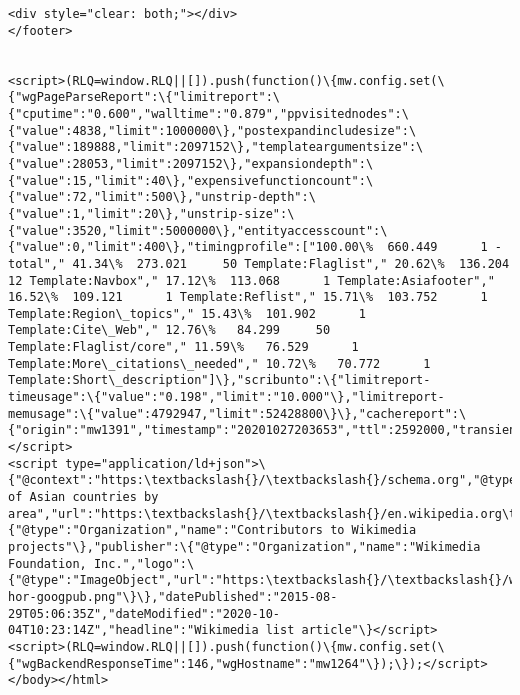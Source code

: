 \documentclass[11pt]{article}
\begin{document}
\begin{Verbatim}[commandchars=\\\{\}]
	<div style="clear: both;"></div>
</footer>


<script>(RLQ=window.RLQ||[]).push(function()\{mw.config.set(\{"wgPageParseReport":\{"limitreport":\{"cputime":"0.600","walltime":"0.879","ppvisitednodes":\{"value":4838,"limit":1000000\},"postexpandincludesize":\{"value":189888,"limit":2097152\},"templateargumentsize":\{"value":28053,"limit":2097152\},"expansiondepth":\{"value":15,"limit":40\},"expensivefunctioncount":\{"value":72,"limit":500\},"unstrip-depth":\{"value":1,"limit":20\},"unstrip-size":\{"value":3520,"limit":5000000\},"entityaccesscount":\{"value":0,"limit":400\},"timingprofile":["100.00\%  660.449      1 -total"," 41.34\%  273.021     50 Template:Flaglist"," 20.62\%  136.204     12 Template:Navbox"," 17.12\%  113.068      1 Template:Asiafooter"," 16.52\%  109.121      1 Template:Reflist"," 15.71\%  103.752      1 Template:Region\_topics"," 15.43\%  101.902      1 Template:Cite\_Web"," 12.76\%   84.299     50 Template:Flaglist/core"," 11.59\%   76.529      1 Template:More\_citations\_needed"," 10.72\%   70.772      1 Template:Short\_description"]\},"scribunto":\{"limitreport-timeusage":\{"value":"0.198","limit":"10.000"\},"limitreport-memusage":\{"value":4792947,"limit":52428800\}\},"cachereport":\{"origin":"mw1391","timestamp":"20201027203653","ttl":2592000,"transientcontent":false\}\}\});\});</script>
<script type="application/ld+json">\{"@context":"https:\textbackslash{}/\textbackslash{}/schema.org","@type":"Article","name":"List of Asian countries by area","url":"https:\textbackslash{}/\textbackslash{}/en.wikipedia.org\textbackslash{}/wiki\textbackslash{}/List\_of\_Asian\_countries\_by\_area","sameAs":"http:\textbackslash{}/\textbackslash{}/www.wikidata.org\textbackslash{}/entity\textbackslash{}/Q20983969","mainEntity":"http:\textbackslash{}/\textbackslash{}/www.wikidata.org\textbackslash{}/entity\textbackslash{}/Q20983969","author":\{"@type":"Organization","name":"Contributors to Wikimedia projects"\},"publisher":\{"@type":"Organization","name":"Wikimedia Foundation, Inc.","logo":\{"@type":"ImageObject","url":"https:\textbackslash{}/\textbackslash{}/www.wikimedia.org\textbackslash{}/static\textbackslash{}/images\textbackslash{}/wmf-hor-googpub.png"\}\},"datePublished":"2015-08-29T05:06:35Z","dateModified":"2020-10-04T10:23:14Z","headline":"Wikimedia list article"\}</script>
<script>(RLQ=window.RLQ||[]).push(function()\{mw.config.set(\{"wgBackendResponseTime":146,"wgHostname":"mw1264"\});\});</script>
</body></html>

    \end{Verbatim}
\end{document}
